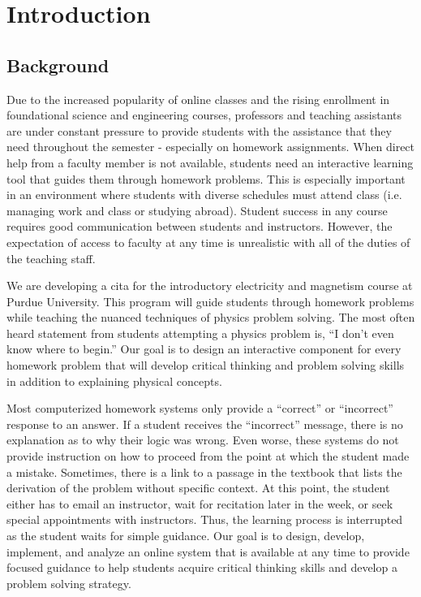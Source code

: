 \chapter[Chapter 1: Introduction]{Introduction}

\section{Background}

Due to the increased popularity of online classes and the rising enrollment in foundational science and engineering courses, professors and teaching assistants are under constant pressure to provide students with the assistance that they need throughout the semester - especially on homework assignments. When direct help from a faculty member is not available, students need an interactive learning tool that guides them through homework problems. This is especially important in an environment where students with diverse schedules must attend class (i.e. managing work and class or studying abroad). Student success in any course requires good communication between students and instructors. However, the expectation of access to faculty at any time is unrealistic with all of the duties of the teaching staff.

We are developing a \gls{cita} for the introductory electricity and magnetism course at Purdue University. This program will guide students through homework problems while teaching the nuanced techniques of physics problem solving. The most often heard statement from students attempting a physics problem is, ``I don’t even know where to begin.'' Our goal is to design an interactive component for every homework problem that will develop critical thinking and problem solving skills in addition to explaining physical concepts.

Most computerized homework systems only provide a ``correct'' or ``incorrect'' response to an answer. If a student receives the ``incorrect'' message, there is no explanation as to why their logic was wrong. Even worse, these systems do not provide instruction on how to proceed from the point at which the student made a mistake. Sometimes, there is a link to a passage in the textbook that lists the derivation of the problem without specific context. At this point, the student either has to email an instructor, wait for recitation later in the week, or seek special appointments with instructors. Thus, the learning process is interrupted as the student waits for simple guidance. Our goal is to design, develop, implement, and analyze an online system that is available at any time to provide focused guidance to help students acquire critical thinking skills and develop a problem solving strategy.

